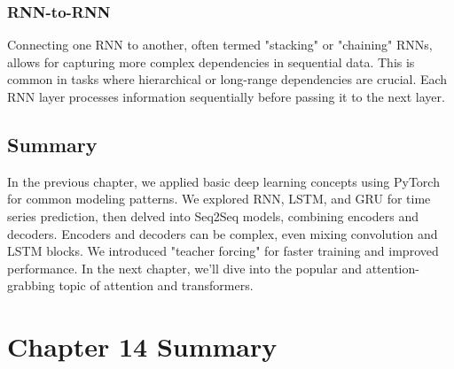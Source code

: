\documentclass{article}
\begin{document}
\subsubsection{RNN-to-RNN}
Connecting one RNN to another, often termed "stacking" or "chaining" RNNs, allows for capturing more complex dependencies in sequential data. This is common in tasks where hierarchical or long-range dependencies are crucial. Each RNN layer processes information sequentially before passing it to the next layer.

\subsection{Summary}
In the previous chapter, we applied basic deep learning concepts using PyTorch for common modeling patterns. We explored RNN, LSTM, and GRU for time series prediction, then delved into Seq2Seq models, combining encoders and decoders. Encoders and decoders can be complex, even mixing convolution and LSTM blocks. We introduced "teacher forcing" for faster training and improved performance. In the next chapter, we'll dive into the popular and attention-grabbing topic of attention and transformers.

\section{Chapter 14 Summary}
\end{document}
